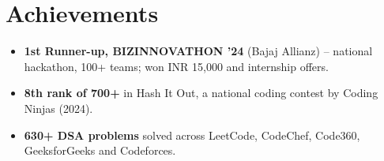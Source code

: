 \documentclass[letterpaper,11pt]{article}
\newcommand{\resumeItem}[1]{\item #1}
\begin{document}
\section{Achievements}
\begin{itemize}[leftmargin=0.2in, before=\small]
  \resumeItem{\textbf{1st Runner-up, BIZINNOVATHON '24} (Bajaj Allianz) -- national hackathon, 100+ teams; won INR 15,000 and internship offers.}
  \resumeItem{\textbf{8th rank of 700+} in Hash It Out, a national coding contest by Coding Ninjas (2024).}
  \resumeItem{\textbf{630+ DSA problems} solved across LeetCode, CodeChef, Code360, GeeksforGeeks and Codeforces.}
\end{itemize}
\end{document}
